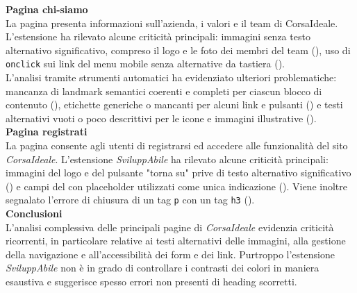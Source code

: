\noindent \textbf{Pagina chi-siamo}\\
La pagina presenta informazioni sull’azienda, i valori e il team di CorsaIdeale. 
L’estensione ha rilevato alcune criticità principali: immagini senza testo alternativo significativo, compreso il logo e le foto dei membri del team ({}), uso di \texttt{onclick} sui link del menu mobile senza alternative da tastiera ({}).\\
L’analisi tramite strumenti automatici ha evidenziato ulteriori problematiche: mancanza di landmark semantici coerenti e completi per ciascun blocco di contenuto ({}), etichette generiche o mancanti per alcuni link e pulsanti ({}) e testi alternativi vuoti o poco descrittivi per le icone e immagini illustrative ({}).\\

\noindent \textbf{Pagina registrati}\\
La pagina consente agli utenti di registrarsi ed accedere alle funzionalità del sito \textit{CorsaIdeale}. 
L’estensione \textit{SviluppAbile} ha rilevato alcune criticità principali: immagini del logo e del pulsante "torna su" prive di testo alternativo significativo ({}) e campi del  con placeholder utilizzati come unica indicazione ({}). Viene inoltre segnalato l'errore di chiusura di un tag \texttt{p} con un tag \texttt{h3} ({}).\\

\noindent \textbf{Conclusioni}\\
L’analisi complessiva delle principali pagine di \textit{CorsaIdeale} evidenzia criticità ricorrenti, in particolare relative ai testi alternativi delle immagini, alla gestione della navigazione e all’accessibilità dei form e dei link. Purtroppo l'estensione \textit{SviluppAbile} non è in grado di controllare i contrasti dei colori in maniera esaustiva e suggerisce spesso errori non presenti di heading scorretti.

